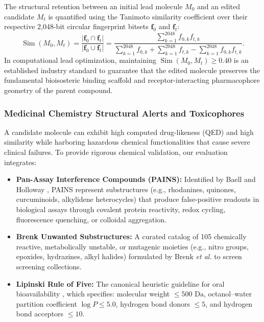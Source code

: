 \documentclass{ieeeaccess}
\begin{document}
The structural retention between an initial lead molecule $M_0$ and an edited candidate $M_t$ is quantified using the Tanimoto similarity coefficient over their respective 2,048-bit circular fingerprint bitsets $\mathbf{f}_0$ and $\mathbf{f}_t$:
\begin{equation}
\operatorname{Sim}(M_0, M_t) = \frac{|\mathbf{f}_0 \cap \mathbf{f}_t|}{|\mathbf{f}_0 \cup \mathbf{f}_t|} = \frac{\sum_{k=1}^{2048} f_{0, k} f_{t, k}}{\sum_{k=1}^{2048} f_{0, k} + \sum_{k=1}^{2048} f_{t, k} - \sum_{k=1}^{2048} f_{0, k} f_{t, k}}.
\label{eq:tanimoto}
\end{equation}
In computational lead optimization, maintaining $\operatorname{Sim}(M_0, M_t) \ge 0.40$ is an established industry standard to guarantee that the edited molecule preserves the fundamental bioisosteric binding scaffold and receptor-interacting pharmacophore geometry of the parent compound.

\subsubsection{Medicinal Chemistry Structural Alerts and Toxicophores}
A candidate molecule can exhibit high computed drug-likeness (QED) and high similarity while harboring hazardous chemical functionalities that cause severe clinical failures. To provide rigorous chemical validation, our evaluation integrates:
\begin{itemize}
    \item \textbf{Pan-Assay Interference Compounds (PAINS):} Identified by Baell and Holloway \cite{baell2010}, PAINS represent substructures (e.g., rhodanines, quinones, curcuminoids, alkylidene heterocycles) that produce false-positive readouts in biological assays through covalent protein reactivity, redox cycling, fluorescence quenching, or colloidal aggregation.
    \item \textbf{Brenk Unwanted Substructures:} A curated catalog of 105 chemically reactive, metabolically unstable, or mutagenic moieties (e.g., nitro groups, epoxides, hydrazines, alkyl halides) formulated by Brenk \emph{et al.} \cite{brenk2008} to screen screening collections.
    \item \textbf{Lipinski Rule of Five:} The canonical heuristic guideline for oral bioavailability \cite{lipinski2001}, which specifies: molecular weight $\le 500\text{ Da}$, octanol--water partition coefficient $\log P \le 5.0$, hydrogen bond donors $\le 5$, and hydrogen bond acceptors $\le 10$.
\end{itemize}
\end{document}
